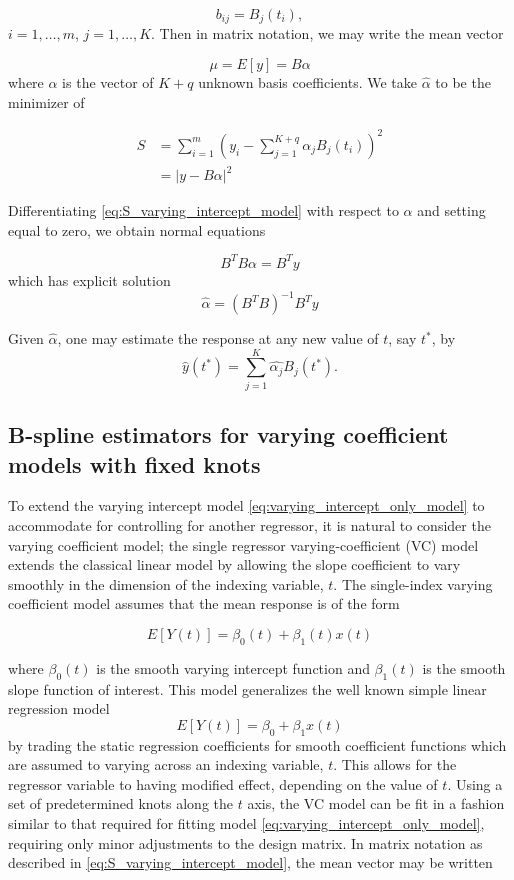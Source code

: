 \documentclass[12pt]{article}
\newcommand*\needsparaphrased{\color{red}}
\theoremstyle{definition}
\begin{document}
\[
b_{ij} = B_j\left(t_i\right),
\]
$i=1,\dots,m$, $j=1,\dots,K$. Then in matrix notation, we may write the mean vector

\[
\mu = E\left[y\right] = B\alpha
\]
\noindent
where $\alpha$ is the vector of $K+q$ unknown basis coefficients. We take $\hat{\alpha}$ to be the minimizer of 

\begin{align}
S &= \sum_{i=1}^m \left(y_i - \sum_{j=1}^{K+q} \alpha_j B_j\left(t_i\right) \right)^2 \nonumber\\
&=\vert y - B\alpha \vert^2 \label{eq:S_varying_intercept_model}
\end{align}

{\needsparaphrased{[not sure about the indexing on the basis function coefficients. If there are K basis functions, should I not only need K coefficients?]}}
Differentiating \ref{eq:S_varying_intercept_model} with respect to $\alpha$ and setting equal to zero, we obtain normal equations

\[
B^TB\alpha = B^Ty
\]
which has explicit solution
\[
\hat{\alpha} = \left(B^T B\right)^{-1}B^Ty
\]

Given $\hat{\alpha}$, one may estimate the response at any new value of $t$, say $t^*$, by 
\[
\hat{y}\left(t^*\right) = \sum_{j=1}^{K} \hat{\alpha_j}B_j\left(t^*\right).
\]

\subsection{B-spline estimators for varying coefficient models with fixed knots}

To extend the varying intercept model \ref{eq:varying_intercept_only_model} to accommodate for controlling for another regressor, it is natural to consider the varying coefficient model; the single regressor varying-coefficient (VC) model extends the classical linear model by allowing the slope coefficient to vary smoothly in the dimension of the indexing variable, $t$.  The single-index varying coefficient model assumes that the mean response is of the form

\begin{equation} \label{eq:simplest_VC_model_mean}
E\left[ Y\left(t\right) \right] = \beta_0\left(t\right) + \beta_1\left(t\right)x\left(t\right)
\end{equation}

where $\beta_0\left(t\right)$ is the smooth varying intercept function and $\beta_1\left(t\right)$ is the smooth slope function of interest. This model generalizes the well known simple linear regression model 
\[
E\left[Y\left(t\right)\right] = \beta_0 + \beta_1 x\left(t\right)
\]
by trading the static regression coefficients for smooth coefficient functions which are assumed to varying across an indexing variable, $t$. This allows for the regressor variable to having modified effect, depending on the value of $t$. Using a set of predetermined knots along the $t$ axis, the VC model can be fit in a fashion similar to that required for fitting model \ref{eq:varying_intercept_only_model}, requiring only minor adjustments to the design matrix. In matrix notation as described in \ref{eq:S_varying_intercept_model}, the mean vector may be written
\end{document}
